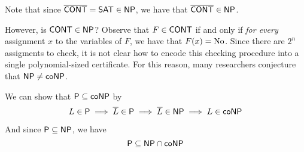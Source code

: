 Note that since $\overline{\mathsf{CONT}}=\mathsf{SAT}\in\mathsf{NP}$, we have that
$\overline{\mathsf{CONT}}\in\mathsf{NP}$.

However, is $\mathsf{CONT}\in\mathsf{NP}$? Observe that $F\in\mathsf{CONT}$ if and only if \textit{for
  every} assignment $x$ to the variables of $F$, we have that $F(x)=\text{No}$. Since
there are $2^n$ assigments to check, it is not clear how to encode this
checking procedure into a single polynomial-sized certificate. For this reason,
many researchers conjecture that $\mathsf{NP}\neq\mathsf{coNP}$.

\label{e6ea03d}

We can show that $\mathsf{P}\subseteq\mathsf{coNP}$ by
$$L\in\mathsf{P}\implies\overline L\in\mathsf{P}\implies\overline L\in\mathsf{NP}\implies L\in\mathsf{coNP}$$

And since $\mathsf{P}\subseteq\mathsf{NP}$, we have
$$\mathsf{P}\subseteq\mathsf{NP}\cap\mathsf{coNP}$$


